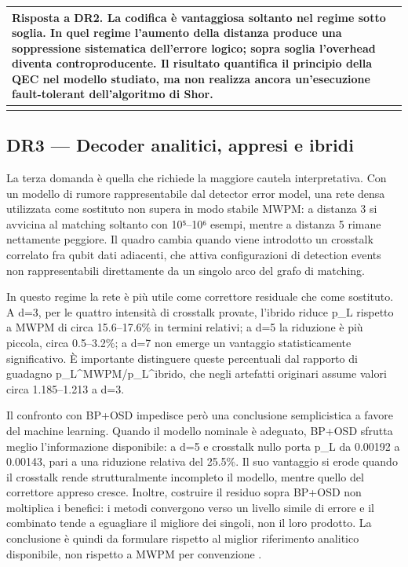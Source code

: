{\def\LTcaptype{none} %
\begin{longtable}[]{@{}
  >{\raggedright\arraybackslash}p{}@{}}
\toprule\noalign{}
\begin{minipage}[b]{\linewidth}\raggedright
\textbf{Risposta a DR2.} La codifica è vantaggiosa soltanto nel regime sotto soglia. In quel regime l'aumento della distanza produce una soppressione sistematica dell'errore logico; sopra soglia l'overhead diventa controproducente. Il risultato quantifica il principio della QEC nel modello studiato, ma non realizza ancora un'esecuzione fault-tolerant dell'algoritmo di Shor.
\end{minipage} \\
\midrule\noalign{}
\endhead
\bottomrule\noalign{}
\endlastfoot
\end{longtable}
}

\subsection{DR3 --- Decoder analitici, appresi e ibridi}\label{sec:finale_6_1_3}

La terza domanda è quella che richiede la maggiore cautela interpretativa. Con un modello di rumore rappresentabile dal detector error model, una rete densa utilizzata come sostituto non supera in modo stabile MWPM: a distanza 3 si avvicina al matching soltanto con 10⁵--10⁶ esempi, mentre a distanza 5 rimane nettamente peggiore. Il quadro cambia quando viene introdotto un crosstalk correlato fra qubit dati adiacenti, che attiva configurazioni di detection events non rappresentabili direttamente da un singolo arco del grafo di matching.

In questo regime la rete è più utile come correttore residuale che come sostituto. A d=3, per le quattro intensità di crosstalk provate, l'ibrido riduce p\_L rispetto a MWPM di circa 15.6--17.6\% in termini relativi; a d=5 la riduzione è più piccola, circa 0.5--3.2\%; a d=7 non emerge un vantaggio statisticamente significativo. È importante distinguere queste percentuali dal rapporto di guadagno p\_L\^{}MWPM/p\_L\^{}ibrido, che negli artefatti originari assume valori circa 1.185--1.213 a d=3.

Il confronto con BP+OSD \cite{roffe2020,panteleev2021} impedisce però una conclusione semplicistica a favore del machine learning. Quando il modello nominale è adeguato, BP+OSD sfrutta meglio l'informazione disponibile: a d=5 e crosstalk nullo porta p\_L da 0.00192 a 0.00143, pari a una riduzione relativa del 25.5\%. Il suo vantaggio si erode quando il crosstalk rende strutturalmente incompleto il modello, mentre quello del correttore appreso cresce. Inoltre, costruire il residuo sopra BP+OSD non moltiplica i benefici: i metodi convergono verso un livello simile di errore e il combinato tende a eguagliare il migliore dei singoli, non il loro prodotto. La conclusione è quindi da formulare rispetto al miglior riferimento analitico disponibile, non rispetto a MWPM per convenzione \cite{alphaqubit2024,torlaiMelko2017,roffe2020,panteleev2021}.

